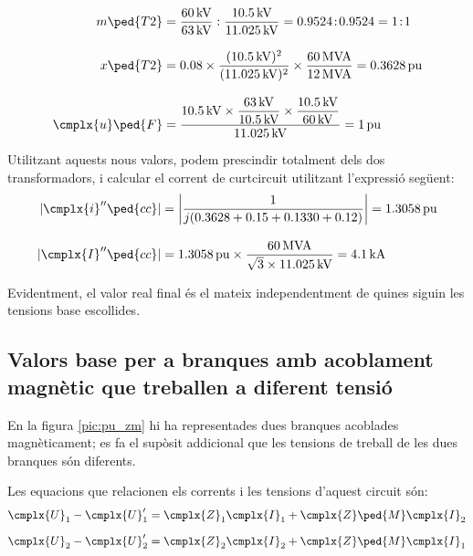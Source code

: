 \begin{exemple}[\MetodeCalculPU{}]
    \begin{align*}
       m\ped{T2} &= \frac{\qty{60}{kV}}{\qty{63}{kV}} : \frac{\qty{10,5}{kV}}{\qty{11,025}{kV}}
       = \num{0,9524}\!:\!\num{0,9524} = 1\!:\!1 \\[3mm]
       x\ped{T2} &= \num{0,08} \times \frac{(\qty{10,5}{kV})^2}{(\qty{11,025}{kV})^2 } \times
       \frac{\qty{60}{MVA}}{\qty{12}{MVA}}  = \qty{0,3628}{pu}\\[3mm]
       \cmplx{u}\ped{F} &= \frac{\qty{10,5}{kV} \times \dfrac{\qty{63}{kV}}{\qty{10,5}{kV}} \times
       \dfrac{\qty{10,5}{kV}}{\qty{60}{kV}}}{\qty{11,025}{kV}} = \qty{1}{pu}
    \end{align*}

    Utilitzant aquests nous valors, podem prescindir totalment dels dos
    transformadors, i calcular el corrent de curtcircuit utilitzant
    l'expressió següent:
    \begin{align*}
    |\cmplx{i}''\ped{cc}| &= \left| \frac{1}{j ( \num{0,3628} + \num{0,15} +
    \num{0,1330} + \num{0,12} )} \right| = \qty{1,3058}{pu} \\[3mm]
    |\cmplx{I}''\ped{cc}| &=
    \qty{1,3058}{pu}\times\frac{\qty{60}{MVA}}{\sqrt{3}\times \qty{11,025}{kV}} =
    \qty{4,1}{kA}
    \end{align*}

    Evidentment, el valor real final és el mateix independentment de quines
    siguin les tensions base escollides.
\end{exemple}

\subsection{Valors base per a branques amb acoblament magnètic que treballen a diferent tensió}

En la figura \vref{pic:pu_zm} hi ha representades dues branques acoblades magnèticament; es fa el supòsit addicional que les tensions de treball de les dues branques són diferents.

\begin{center}
    
    \label{pic:pu_zm}
\end{center}

Les equacions que relacionen els corrents i les tensions d'aquest circuit són:
\begin{subequations}
\begin{align}
    \cmplx{U}_1 - \cmplx{U}'_1 &= \cmplx{Z}_1 \cmplx{I}_1 + \cmplx{Z}\ped{M} \cmplx{I}_2   \\[2mm]
    \cmplx{U}_2 - \cmplx{U}'_2 &= \cmplx{Z}_2 \cmplx{I}_2 + \cmplx{Z}\ped{M} \cmplx{I}_1
\end{align}
\end{subequations}

